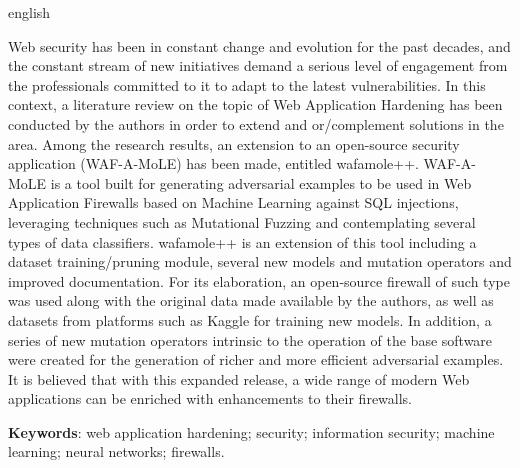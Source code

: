 \begin{resumo}[Abstract]
\begin{otherlanguage*}{english}
\begin{SingleSpace}
Web security has been in constant change and evolution for the past decades, and the constant stream of new initiatives demand a serious level of engagement from the professionals committed to it to adapt to the latest vulnerabilities. In this context, a literature review on the topic of Web Application Hardening has been conducted by the authors in order to extend and or/complement solutions in the area. Among the research results, an extension to an open-source security application (WAF-A-MoLE) has been made, entitled wafamole++. WAF-A-MoLE is a tool built for generating adversarial examples to be used in Web Application Firewalls based on Machine Learning against SQL injections, leveraging techniques such as Mutational Fuzzing and contemplating several types of data classifiers. wafamole++ is an extension of this tool including a dataset training/pruning module, several new models and mutation operators and improved documentation. For its elaboration, an open-source firewall of such type was used along with the original data made available by the authors, as well as datasets from platforms such as Kaggle for training new models. In addition, a series of new mutation operators intrinsic to the operation of the base software were created for the generation of richer and more efficient adversarial examples. It is believed that with this expanded release, a wide range of modern Web applications can be enriched with enhancements to their firewalls.
\end{SingleSpace}


\vspace{\onelineskip}
   \textbf{Keywords}: web application hardening; security; information security; machine learning; neural networks; firewalls.
   
 \end{otherlanguage*}
\end{resumo}




  
